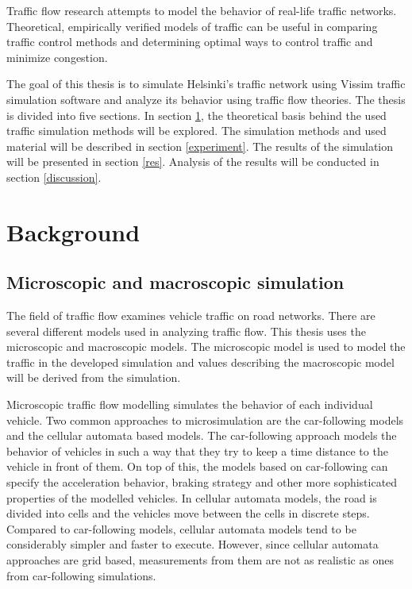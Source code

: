 \documentclass[english, 12pt, a4paper, elec, utf8, pdfa, online]{aaltothesis}
\begin{document}
Traffic flow research attempts to model the behavior of real-life traffic networks. Theoretical, empirically verified models of traffic can be useful in comparing traffic control methods and determining optimal ways to control traffic and minimize congestion.

The goal of this thesis is to simulate Helsinki's traffic network using Vissim traffic simulation software and analyze its behavior using traffic flow theories. The thesis is divided into five sections. In section \ref{bg}, the theoretical basis behind the used traffic simulation methods will be explored. The simulation methods and used material will be described in section \ref{experiment}. The results of the simulation will be presented in section \ref{res}. Analysis of the results will be conducted in section \ref{discussion}.

\clearpage

\section{Background} \label{bg}

\subsection{Microscopic and macroscopic simulation}

The field of traffic flow examines vehicle traffic on road networks. There are several different models used in analyzing traffic flow. This thesis uses the microscopic and macroscopic models. The microscopic model is used to model the traffic in the developed simulation and values describing the macroscopic model will be derived from the simulation.

Microscopic traffic flow modelling simulates the behavior of each individual vehicle. Two common approaches to microsimulation are the car-following models and the cellular automata based models. The car-following approach models the behavior of vehicles in such a way that they try to keep a time distance to the vehicle in front of them. On top of this, the models based on car-following can specify the acceleration behavior, braking strategy and other more sophisticated properties of the modelled vehicles. In cellular automata models, the road is divided into cells and the vehicles move between the cells in discrete steps. Compared to car-following models, cellular automata models tend to be considerably simpler and faster to execute. However, since cellular automata approaches are grid based, measurements from them are not as realistic as ones from car-following simulations.
\end{document}
